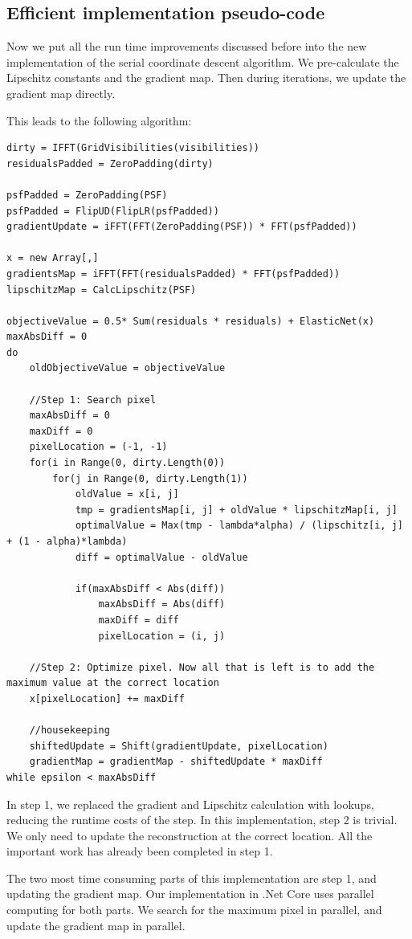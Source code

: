 \subsection{Efficient implementation pseudo-code}
Now we put all the run time improvements discussed before into the new implementation of the serial coordinate descent algorithm. We pre-calculate the Lipschitz constants and the gradient map. Then during iterations, we update the gradient map directly.

This leads to the following algorithm:
\begin{lstlisting}
dirty = IFFT(GridVisibilities(visibilities))
residualsPadded = ZeroPadding(dirty)

psfPadded = ZeroPadding(PSF)
psfPadded = FlipUD(FlipLR(psfPadded))
gradientUpdate = iFFT(FFT(ZeroPadding(PSF)) * FFT(psfPadded))

x = new Array[,]
gradientsMap = iFFT(FFT(residualsPadded) * FFT(psfPadded))
lipschitzMap = CalcLipschitz(PSF)

objectiveValue = 0.5* Sum(residuals * residuals) + ElasticNet(x)
maxAbsDiff = 0
do 
	oldObjectiveValue = objectiveValue
	
	//Step 1: Search pixel
	maxAbsDiff = 0
	maxDiff = 0
	pixelLocation = (-1, -1)
	for(i in Range(0, dirty.Length(0))
		for(j in Range(0, dirty.Length(1))
			oldValue = x[i, j]
			tmp = gradientsMap[i, j] + oldValue * lipschitzMap[i, j]
			optimalValue = Max(tmp - lambda*alpha) / (lipschitz[i, j] + (1 - alpha)*lambda)
			diff = optimalValue - oldValue
			
			if(maxAbsDiff < Abs(diff))
				maxAbsDiff = Abs(diff)
				maxDiff = diff
				pixelLocation = (i, j)
	
	//Step 2: Optimize pixel. Now all that is left is to add the maximum value at the correct location
	x[pixelLocation] += maxDiff
	
	//housekeeping
	shiftedUpdate = Shift(gradientUpdate, pixelLocation)
	gradientMap = gradientMap - shiftedUpdate * maxDiff
while epsilon < maxAbsDiff
\end{lstlisting}

In step 1, we replaced the gradient and Lipschitz calculation with lookups, reducing the runtime costs of the step. In this implementation, step 2 is trivial. We only need to update the reconstruction at the correct location. All the important work has already been completed in step 1.

The two most time consuming parts of this implementation are step 1, and updating the gradient map. Our implementation in .Net Core uses parallel computing for both parts. We search for the maximum pixel in parallel, and update the gradient map in parallel.


